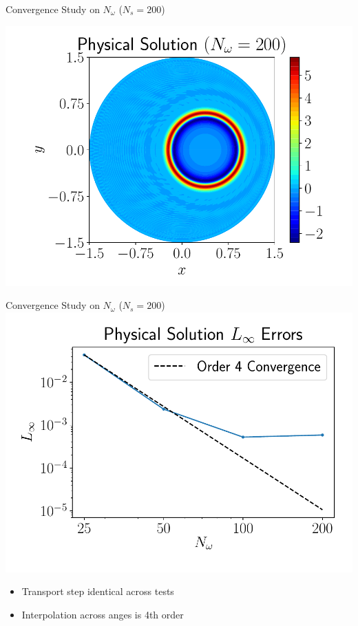 \documentclass{beamer}
\begin{document}
\begin{frame}{Convergence Study on $N_\omega$ \quad ($N_s = 200$)}
{\begin{minipage}{0.41\linewidth}
		\end{minipage}
		\hspace{-0.45cm}
		\begin{minipage}{0.41\linewidth}
			\includegraphics[width=\linewidth]{figures/Physical_Solution_Nonsymmetric_200.pdf} 
		\end{minipage}
	}
\end{frame}

\begin{frame}{Convergence Study on $N_\omega$ ($N_s = 200$)}
	\centering
	\includegraphics[width=0.6\linewidth]{figures/Convergence_Physical_Errors_Nw.pdf}
	\begin{itemize}
		\item Transport step identical across tests
		\item Interpolation across anges is 4th order
	\end{itemize}    
\end{frame}
\end{document}
